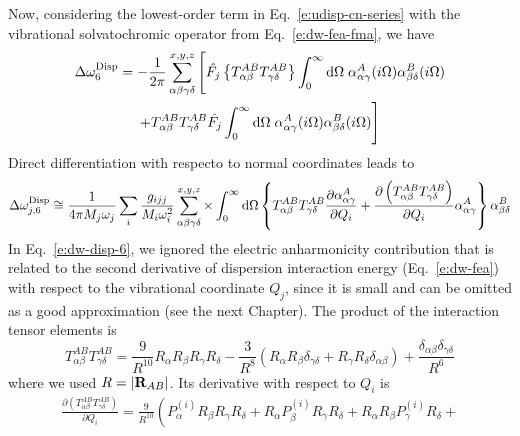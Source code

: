\documentclass[a4paper,titlepage,twoside,fleqn,12pt]{book}
\newcommand{\fderiv}[2]{\ensuremath{
\frac{\partial #1}{\partial #2}}}
\begin{document}
\begin{refsection}
Now, considering the lowest\hyp{}order term in Eq.~\eqref{e:udisp-cn-series} 
with the vibrational solvatochromic operator from Eq.~\eqref{e:dw-fea-fma}, we have
%
\begin{multline}
   \Delta\omega^{\rm Disp}_6 = - \frac{1}{2\pi} \sum_{\alpha\beta\gamma\delta}^{x,y,z} 
   \Bigg[ 
   \hat{F_j} \left\{ T^{AB}_{\alpha\beta}T^{AB}_{\gamma\delta} \right\} \int_0^{\infty} {\rm d}\Omega \; 
    \alpha^A_{\alpha\gamma}(i\Omega)\alpha^B_{\beta\delta}(i\Omega) \\
   + 
   T^{AB}_{\alpha\beta}T^{AB}_{\gamma\delta} \hat{F_j} \int_0^{\infty} {\rm d}\Omega \;
   \alpha^A_{\alpha\gamma}(i\Omega)\alpha^B_{\beta\delta}(i\Omega) 
   \Bigg]
\end{multline}
%
Direct differentiation with respecto to normal coordinates leads to 
%
\begin{equation} \label{e:dw-disp-6}
 \Delta\omega_{j,6}^{\rm Disp} \cong 
\frac{1}{4\pi M_j\omega_j}\sum_i \frac{g_{ijj}}{M_i\omega_i^2} 
\sum_{\alpha\beta\gamma\delta}^{x,y,z}   \times \int_{0}^{\infty} {\rm d}\Omega
%
 \left\{
T^{AB}_{\alpha\beta}T^{AB}_{\gamma\delta}
\frac{\partial \alpha_{\alpha\gamma}^{A}}{\partial Q_i}
+
\frac{\partial \left(T^{AB}_{\alpha\beta}T^{AB}_{\gamma\delta}\right)}{\partial Q_i}
\alpha_{\alpha\gamma}^{A}
\right\}
\alpha_{\beta\delta}^{B}
\end{equation}
%
In Eq.~\eqref{e:dw-disp-6}, we ignored the electric anharmonicity contribution 
that is related to the second derivative of dispersion interaction energy 
(Eq.~\eqref{e:dw-fea}) with respect to the vibrational coordinate $Q_j$, 
since it is small and can be omitted as a good approximation 
(see the next Chapter). 
The product of the interaction tensor elements is
%
\begin{equation} \label{e:378463267}
 T^{AB}_{\alpha\beta} T^{AB}_{\gamma\delta} = \frac{9}{R^{10}} R_\alpha R_\beta R_\gamma R_\delta
 - \frac{3}{R^8} \left( R_\alpha R_\beta \delta_{\gamma\delta} + R_\gamma R_\delta \delta_{\alpha\beta}\right)
 + \frac{\delta_{\alpha\beta}\delta_{\gamma\delta}}{R^6}
\end{equation}
%
where we used $R=\left|{\bf R}_{AB}\right|$.
Its derivative with respect to $Q_i$ is
%
\begin{multline} \label{e:happylabel}
 \fderiv{\left( T^{AB}_{\alpha\beta} T^{AB}_{\gamma\delta} \right)}{Q_i} = 
  \frac{9}{R^{10}} 
   \left( 
     P^{(i)}_\alpha R_\beta R_\gamma R_\delta + 
     R_\alpha P^{(i)}_\beta R_\gamma R_\delta +
     R_\alpha R_\beta P^{(i)}_\gamma R_\delta +

\end{multline}
\end{refsection}
\end{document}
